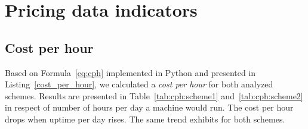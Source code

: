 \documentclass[]{final_report}
\begin{document}
\section{Pricing data indicators}

\subsection{Cost per hour}

Based on Formula~\ref{eq:cph} implemented in Python and presented in Listing~\ref{cost_per_hour}, we calculated a \textit{cost per hour} for both analyzed schemes. Results are presented in Table~\ref{tab:cph:scheme1} and~\ref{tab:cph:scheme2} in respect of number of hours per day a machine would run. The cost per hour drops when uptime per day rises. The same trend exhibits for both schemes.
\end{document}
